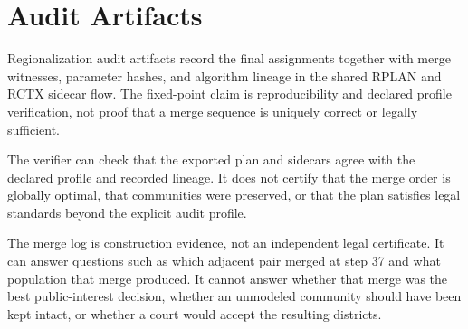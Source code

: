 \section{Audit Artifacts}

Regionalization audit artifacts record the final assignments together with
merge witnesses, parameter hashes, and algorithm lineage in the shared
RPLAN and RCTX sidecar flow. The fixed-point claim is reproducibility and declared
profile verification, not proof that a merge sequence is uniquely correct or
legally sufficient.

The verifier can check that the exported plan and sidecars agree with the
declared profile and recorded lineage. It does not certify that the merge order
is globally optimal, that communities were preserved, or that the plan satisfies
legal standards beyond the explicit audit profile.

The merge log is construction evidence, not an independent legal certificate.
It can answer questions such as which adjacent pair merged at step 37 and what
population that merge produced. It cannot answer whether that merge was the
best public-interest decision, whether an unmodeled community should have been
kept intact, or whether a court would accept the resulting districts.
